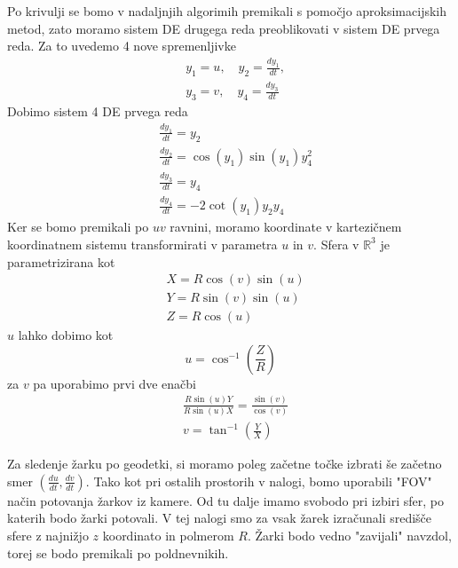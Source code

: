 \documentclass[titlepage]{article}
\begin{document}
Po krivulji se bomo v nadaljnjih algorimih premikali s pomočjo aproksimacijskih metod, zato moramo sistem DE drugega reda preoblikovati v
sistem DE prvega reda. Za to uvedemo 4 nove spremenljivke
\begin{equation}
\begin{split}
    &y_{1}=u, \quad y_{2}=\frac{dy_{1}}{dt}, \\
    &y_{3}=v, \quad y_{4}=\frac{dy_{3}}{dt}
\end{split}
\end{equation}
Dobimo sistem 4 DE prvega reda
\begin{equation} \label{e:geoSys}
\begin{split}
    &\frac{dy_{1}}{dt}=y_{2} \\
    &\frac{dy_{2}}{dt}=\cos(y_{1})\sin(y_{1})y^{2}_{4} \\
    &\frac{dy_{3}}{dt}=y_{4} \\
    &\frac{dy_{4}}{dt}=-2\cot(y_{1})y_{2}y_{4}
\end{split}
\end{equation}
Ker se bomo premikali po \( uv \) ravnini, moramo koordinate v kartezičnem koordinatnem sistemu transformirati v parametra \( u \) in \( v \). Sfera v \(\mathbb{R}^3\) je
parametrizirana kot
\begin{equation} \label{e:toXYZ}
    \begin{split}
        &X=R\cos(v)\sin(u) \\
        &Y=R\sin(v)\sin(u) \\
        &Z=R\cos(u)
    \end{split}
\end{equation}
\( u \) lahko dobimo kot
\begin{equation} \label{e:toU}
        u=\cos^{-1} \left( \frac{Z}{R} \right)
\end{equation}
za \( v \) pa uporabimo prvi dve enačbi
\begin{equation} \label{e:toV}
    \begin{split}
        &\frac{R\sin(u)Y}{R\sin(u)X}=\frac{\sin(v)}{\cos(v)} \\
        &v=\tan^{-1} \left(\frac{Y}{X} \right)
    \end{split}
\end{equation}

Za sledenje žarku po geodetki, si moramo poleg začetne točke izbrati še začetno smer
\(\left( \frac{du}{dt}, \frac{dv}{dt} \right) \). Tako kot pri ostalih prostorih v nalogi, bomo uporabili "FOV" način
potovanja žarkov iz kamere. Od tu dalje imamo svobodo pri izbiri sfer, po katerih bodo žarki potovali. V tej nalogi smo za
vsak žarek izračunali središče sfere z najnižjo \( z \) koordinato in polmerom \( R \). Žarki bodo vedno "zavijali" navzdol, torej se bodo premikali po poldnevnikih.
\end{document}
